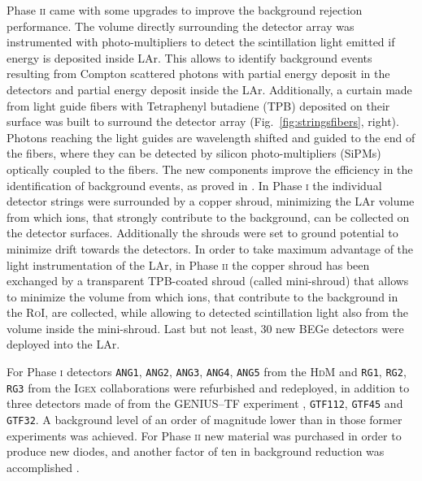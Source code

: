 Phase \textsc{ii} came with some upgrades to improve the background rejection performance. The volume directly surrounding the detector array was instrumented with photo-multipliers to detect the scintillation light emitted if energy is deposited inside LAr. This allows to identify background events resulting from Compton scattered photons with partial energy deposit in the detectors and partial energy deposit inside the LAr. Additionally, a curtain made from light guide fibers with Tetraphenyl butadiene (TPB) deposited on their surface was built to surround the detector array (Fig.~\ref{fig:stringsfibers}, right). Photons reaching the light guides are wavelength shifted and guided to the end of the fibers, where they can be detected by silicon photo-multipliers (SiPMs) optically coupled to the fibers. The new components improve the efficiency in the identification of background events, as proved in \cite{nature}. In Phase \textsc{i} the individual detector strings were surrounded by a copper shroud, minimizing the LAr volume from which  ions, that strongly contribute to the background, can be collected on the detector surfaces. Additionally the shrouds were set to ground potential to minimize drift towards the detectors. In order to take maximum advantage of the light instrumentation of the LAr, in Phase \textsc{ii} the copper shroud has been exchanged by a transparent TPB-coated shroud (called mini-shroud) that allows to minimize the volume from which  ions, that contribute to the background in the \textsc{RoI}, are collected, while allowing to detected scintillation light also from the volume inside the mini-shroud. Last but not least, 30 new BEGe detectors were deployed into the LAr.

 For Phase \textsc{i} detectors \texttt{ANG1}, \texttt{ANG2}, \texttt{ANG3}, \texttt{ANG4}, \texttt{ANG5} from the \textsc{HdM} \cite{hdm} and \texttt{RG1}, \texttt{RG2}, \texttt{RG3} from the \textsc{Igex} \cite{igex} collaborations were refurbished and redeployed, in addition to three detectors made of  from the GENIUS--TF experiment \cite{genius1, genius2}, \texttt{GTF112}, \texttt{GTF45} and \texttt{GTF32}. A background level of an order of magnitude lower than in those former experiments was achieved. For Phase \textsc{ii} new material was purchased in order to produce new diodes, and another factor of ten in background reduction was accomplished \cite{nature}.

